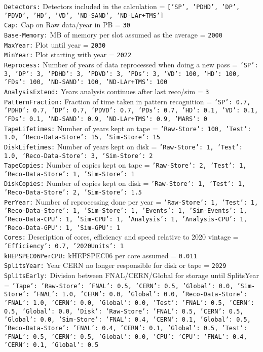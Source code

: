 {\tt Detectors:} Detectors included in the calculation = {\tt ['SP', 'PDHD', 'DP', 'PDVD', 'HD', 'VD', 'ND-SAND', 'ND-LAr+TMS']} \\
{\tt Cap:} Cap on Raw data/year in PB = {\tt 30} \\
{\tt Base-Memory:} MB of memory per slot assumed as the average = {\tt 2000} \\
{\tt MaxYear:} Plot until year = {\tt 2030} \\
{\tt MinYear:} Plot starting with year = {\tt 2022} \\
{\tt Reprocess:} Number of years of data reprocessed when doing a new pass = {\tt {'SP': 3, 'DP': 3, 'PDHD': 3, 'PDVD': 3, 'PDs': 3, 'VD': 100, 'HD': 100, 'FDs': 100, 'ND-SAND': 100, 'ND-LAr+TMS': 100}} \\
{\tt AnalysisExtend:} Years analysis continues after last reco/sim = {\tt 3} \\
{\tt PatternFraction:} Fraction of time taken in pattern recognition = {\tt {'SP': 0.7, 'PDHD': 0.7, 'DP': 0.7, 'PDVD': 0.7, 'PDs': 0.7, 'HD': 0.1, 'VD': 0.1, 'FDs': 0.1, 'ND-SAND': 0.9, 'ND-LAr+TMS': 0.9, 'MARS': 0}} \\
{\tt TapeLifetimes:} Number of years kept on tape = {\tt {'Raw-Store': 100, 'Test': 1.0, 'Reco-Data-Store': 15, 'Sim-Store': 15}} \\
{\tt DiskLifetimes:} Number of years kept on disk = {\tt {'Raw-Store': 1, 'Test': 1.0, 'Reco-Data-Store': 3, 'Sim-Store': 2}} \\
{\tt TapeCopies:} Number of copies kept on tape = {\tt {'Raw-Store': 2, 'Test': 1, 'Reco-Data-Store': 1, 'Sim-Store': 1}} \\
{\tt DiskCopies:} Number of copies kept on disk = {\tt {'Raw-Store': 1, 'Test': 1, 'Reco-Data-Store': 2, 'Sim-Store': 1.5}} \\
{\tt PerYear:} Number of reprocessing done per year = {\tt {'Raw-Store': 1, 'Test': 1, 'Reco-Data-Store': 1, 'Sim-Store': 1, 'Events': 1, 'Sim-Events': 1, 'Reco-Data-CPU': 1, 'Sim-CPU': 1, 'Analysis': 1, 'Analysis-CPU': 1, 'Reco-Data-GPU': 1, 'Sim-GPU': 1}} \\
{\tt Cores:} Description of cores, efficiency and speed relative to 2020 vintage = {\tt {'Efficiency': 0.7, '2020Units': 1}} \\
{\tt kHEPSPEC06PerCPU:} kHEPSPEC06 per core assumed = {\tt 0.011} \\
{\tt SplitsYear:} Year CERN no longer responsible for disk or tape = {\tt 2029} \\
{\tt SplitsEarly:} Division between FNAL/CERN/Global for storage until SplitsYear = {\tt {'Tape': {'Raw-Store': {'FNAL': 0.5, 'CERN': 0.5, 'Global': 0.0}, 'Sim-Store': {'FNAL': 1.0, 'CERN': 0.0, 'Global': 0.0}, 'Reco-Data-Store': {'FNAL': 1.0, 'CERN': 0.0, 'Global': 0.0}, 'Test': {'FNAL': 0.5, 'CERN': 0.5, 'Global': 0.0}}, 'Disk': {'Raw-Store': {'FNAL': 0.5, 'CERN': 0.5, 'Global': 0.0}, 'Sim-Store': {'FNAL': 0.4, 'CERN': 0.1, 'Global': 0.5}, 'Reco-Data-Store': {'FNAL': 0.4, 'CERN': 0.1, 'Global': 0.5}, 'Test': {'FNAL': 0.5, 'CERN': 0.5, 'Global': 0.0}}, 'CPU': {'CPU': {'FNAL': 0.4, 'CERN': 0.1, 'Global': 0.5}}}} \\
